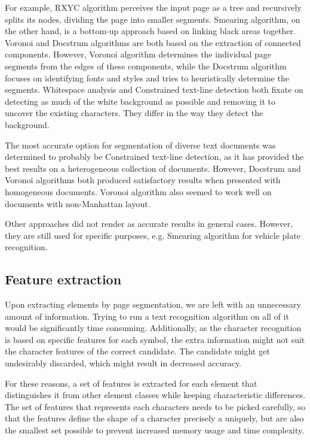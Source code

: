 For example, RXYC algorithm perceives the input page as a tree and recursively splits its nodes, dividing the page into smaller segments. Smearing algorithm, on the other hand, is a bottom-up approach based on linking black areas together. Voronoi and Docstrum algorithms are both based on the extraction of connected components. However, Voronoi algorithm determines the individual page segments from the edges of these components, while the Docstrum algorithm focuses on identifying fonts and styles and tries to heuristically determine the segments. Whitespace analysis and Constrained text-line detection both fixate on detecting as much of the white background as possible and removing it to uncover the existing characters. They differ in the way they detect the background.

The most accurate option for segmentation of diverse text documents was determined to probably be Constrained text-line detection, as it has provided the best results on a heterogeneous collection of documents. However, Docstrum and Voronoi algorithms both produced satisfactory results when presented with homogeneous documents. Voronoi algorithm also seemed to work well on documents with non-Manhattan layout.

Other approaches did not render as accurate results in general cases. However, they are still used for specific purposes, e.g. Smearing algorithm for vehicle plate recognition.

\subsection{Feature extraction}

Upon extracting elements by page segmentation, we are left with an unnecessary amount of information. Trying to run a text recognition algorithm on all of it would be significantly time consuming. Additionally, as the character recognition is based on specific features for each symbol, the extra information might not suit the character features of the correct candidate. The candidate might get undesirably discarded, which might result in decreased accuracy.

For these reasons, a set of features is extracted for each element that distinguishes it from other element classes while keeping characteristic differences. The set of features that represents each characters needs to be picked carefully, so that the features define the shape of a character precisely a uniquely, but are also the smallest set possible to prevent increased memory usage and time complexity.


